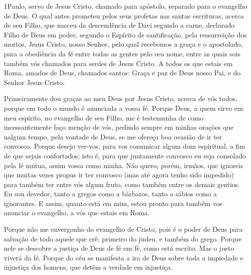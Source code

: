 
\lettrine{1} Paulo, servo de Jesus Cristo, chamado para
apóstolo, separado para o evangelho de Deus. O qual antes
prometeu pelos seus profetas nas santas escrituras, acerca de
seu Filho, que nasceu da descendência de Davi segundo a carne,
declarado Filho de Deus em poder, segundo o Espírito de
santificação, pela ressurreição dos mortos, Jesus Cristo, nosso
Senhor, pelo qual recebemos a graça e o apostolado, para a
obediência da fé entre todas as gentes pelo seu nome, entre as
quais sois também vós chamados para serdes de Jesus Cristo. A
todos os que estais em Roma, amados de Deus, chamados santos: Graça
e paz de Deus nosso Pai, e do Senhor Jesus Cristo.

Primeiramente dou graças ao meu Deus por Jesus Cristo, acerca de
vós todos, porque em todo o mundo é anunciada a vossa fé. Porque
Deus, a quem sirvo em meu espírito, no evangelho de seu Filho, me é
testemunha de como incessantemente faço menção de vós,
pedindo sempre em minhas orações que nalgum tempo, pela
vontade de Deus, se me ofereça boa ocasião de ir ter convosco.
Porque desejo ver-vos, para vos comunicar algum dom
espiritual, a fim de que sejais confortados; isto é, para que
juntamente convosco eu seja consolado pela fé mútua, assim vossa
como minha. Não quero, porém, irmãos, que ignoreis que muitas
vezes propus ir ter convosco (mas até agora tenho sido impedido)
para também ter entre vós algum fruto, como também entre os demais
gentios. Eu sou devedor, tanto a gregos como a bárbaros,
tanto a sábios como a ignorantes. E assim, quanto está em
mim, estou pronto para também vos anunciar o evangelho, a vós que
estais em Roma.

Porque não me envergonho do evangelho de Cristo, pois é o poder
de Deus para salvação de todo aquele que crê; primeiro do judeu, e
também do grego. Porque nele se descobre a justiça de Deus de
fé em fé, como está escrito: Mas o justo viverá da fé. Porque
do céu se manifesta a ira de Deus sobre toda a impiedade e injustiça
dos homens, que detêm a verdade em injustiça.

